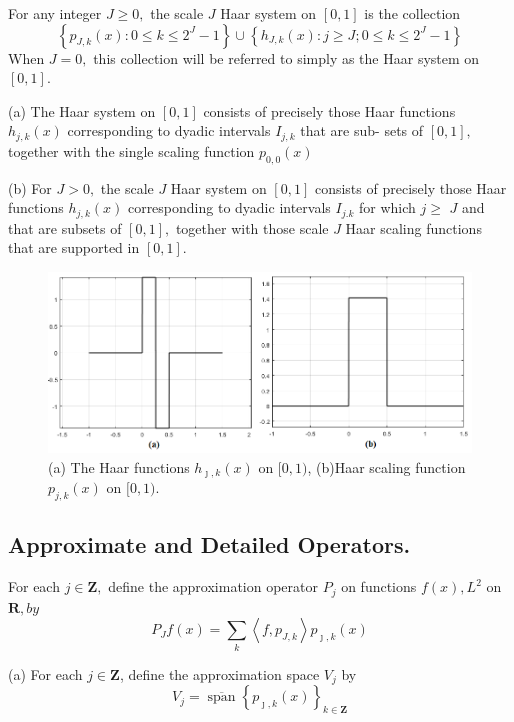 For any integer $J \geq 0,$ the scale $J$ Haar system on $[0,1]$ is
the collection
$$
\left\{p_{J, k}(x): 0 \leq k \leq 2^{J}-1\right\} \cup\left\{h_{J, k}(x): j \geq J ; 0 \leq k \leq 2^{J}-1\right\}
$$
When $J=0,$ this collection will be referred to simply as the Haar system on $[0,1] .$

(a) The Haar system on $[0,1]$ consists of precisely those Haar functions $h_{j, k}(x)$ corresponding to dyadic intervals $I_{j, k}$ that are sub-
sets of $[0,1],$ together with the single scaling function $p_{0,0}(x)$

(b) For $J>0,$ the scale $J$ Haar system on $[0,1]$ consists of precisely those
Haar functions $h_{j, k}(x)$ corresponding to dyadic intervals $I_{j . k}$ for which $j \geq$
$J$ and that are subsets of $[0,1],$ together with those scale $J$ Haar scaling
functions that are supported in $[0,1] .$

\begin{figure}[h]
    \centering
    \includegraphics[width=\textwidth]{sections/Haar_Basis.PNG}
    \caption{(a) The Haar functions $h_{\jmath, k}(x)$ on $[0,1)$, (b)Haar scaling function $p_{j, k}(x)$ on $[0,1)$.}
    \label{fig:Haar}
\end{figure}


\subsection{Approximate and Detailed Operators.}


\begin{definition} For each $j \in \mathbf{Z},$ define the approximation operator $P_{j}$ on
functions $f(x), L^{2}$ on $\mathbf{R}, b y$
$$
P_{J} f(x)=\sum_{k}\left\langle f, p_{J, k}\right\rangle p_{\jmath, k}(x)
$$
\end{definition}

(a) For each $j \in \mathbf{Z}$, define the approximation space $V_{j}$ by
$$
V_{j}=\overline{\operatorname{span}}\left\{p_{\jmath, k}(x)\right\}_{k \in \mathbf{Z}}
$$

